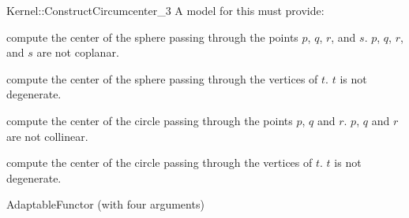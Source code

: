 \begin{ccRefFunctionObjectConcept}{Kernel::ConstructCircumcenter_3}
A model for this must provide:


 {compute the center of the sphere passing through the points $p$, $q$, $r$,
  and $s$.  \ccPrecond $p$, $q$, $r$, and $s$ are not coplanar.}

 {compute the center of the sphere passing through the vertices of $t$.
  \ccPrecond $t$ is not degenerate.}

{compute the center of the circle passing through the points $p$, $q$ and $r$.
  \ccPrecond $p$, $q$ and $r$ are not collinear.}

 {compute the center of the circle passing through the vertices of $t$.
  \ccPrecond $t$ is not degenerate.}

\ccRefines
AdaptableFunctor (with four arguments)

\ccSeeAlso
{} \\

\end{ccRefFunctionObjectConcept}
